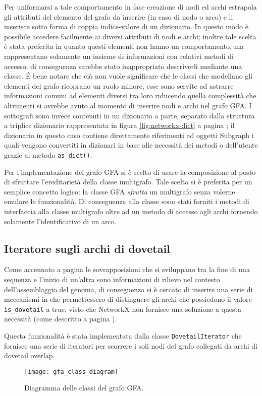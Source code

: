 Per uniformarsi a tale comportamento \pygfa in fase creazione di nodi ed
archi estrapola gli attributi del elemento del grafo da inserire (in caso di nodo o arco)
e li inserisce sotto forma di coppia indice-valore di un dizionario. In questo modo
è possibile accedere facilmente ai diversi attributi di nodi e archi; inoltre
tale scelta è stata preferita in quanto questi elementi non hanno un comportamento,
ma rappresentano solamente un insieme di informazioni con relativi metodi di accesso.
di conseguenza sarebbe stato inappropriato descriverli mediante una classe.
\'E bene notare che ciò non vuole significare che le classi che modellano gli elementi
del grafo ricoprano un ruolo minore, esse sono servite ad astrarre informazioni
comuni ad elementi diversi tra loro riducendo quella complessità che altrimenti si
avrebbe avuto al momento di inserire nodi e archi nel grafo GFA.
I sottografi sono invece contenuti in un dizionario a parte, separato dalla struttura a
triplice dizionario rappresentata in figura \ref{fig:networkx-dict} a pagina \pageref{fig:networkx-dict};
il dizionario in questo caso contiene direttamente riferimenti ad oggetti Subgraph i quali
vengono convertiti in dizionari in base alle necessità dei metodi o dell'utente grazie
al metodo \texttt{as\_dict()}.

Per l'implementazione del grafo GFA si è scelto di usare la composizione al posto
di sfruttare l'ereditarietà della classe multigrafo. Tale scelta si è preferita per
un semplice concetto logico: la classe GFA \emph{sfrutta} un multigrafo senza
volerne emulare le funzionalità. Di conseguenza alla classe sono stati forniti i metodi di interfaccia
alla classe multigrafo oltre ad un metodo di accesso agli archi fornendo
solamente l'identificativo di un arco.

\subsection{Iteratore sugli archi di dovetail}
Come accennato a pagina \pageref{sec:link} le sovrapposizioni
che si sviluppano tra la fine di una sequenza e l'inizio di un'altra sono
informazioni di rilievo nel contesto dell'assemblaggio del genoma,
di conseguenza si è cercato di inserire una serie di meccanismi in \pygfa
che permettessero di distinguere gli archi che possiedono
il valore \texttt{is\_dovetail} a true, visto che NetworkX non fornisce
una soluzione a questa necessità (come descritto a pagina \pageref{sec:nx-why-limits}).

Questa funzionalità è stata implementata dalla classe \texttt{DovetailIterator} che
fornisce una serie di iteratori per scorrere i soli nodi del grafo collegati da archi di
dovetail overlap.
\noindent
\begin{figure}[t]
	\centering
	\texttt{[image: gfa\_class\_diagram]}
	\caption[Diagramma delle classi del grafo GFA]{Diagramma delle classi del grafo GFA.}
\end{figure}
\clearpage


